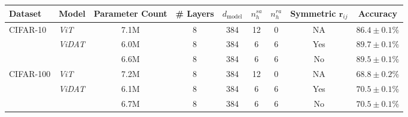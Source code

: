 \begin{tabular}{l|l|cccccc|c}
\toprule
Dataset & Model & Parameter Count & \# Layers & $d_{\text{model}}$ & $n_h^{sa}$ & $n_h^{ra}$ & Symmetric $\bm{r}_{ij}$ & Accuracy\\
\midrule
\multirow{3}{*}{CIFAR-10} & \textit{ViT} & 7.1M & 8 & 384 & 12 & 0 & NA &  $86.4 \pm 0.1\%$ \\\cline{2-9}
          & \multirow{2}{*}{\textit{ViDAT}} & 6.0M & 8 & 384 & 6  & 6 & Yes &  $89.7 \pm 0.1\%$ \\
          &       & 6.6M & 8 & 384 & 6  & 6 & No &  $89.5 \pm 0.1\%$ \\
\midrule
\multirow{3}{*}{CIFAR-100} & \textit{ViT} & 7.2M & 8 & 384 & 12 & 0 & NA &  $68.8 \pm 0.2\%$ \\\cline{2-9}
          & \multirow{2}{*}{\textit{ViDAT}} & 6.1M & 8 & 384 & 6  & 6 & Yes &  $70.5 \pm 0.1\%$ \\
          &       & 6.7M & 8 & 384 & 6  & 6 & No &  $70.5 \pm 0.1\%$ \\
\bottomrule
\end{tabular}
